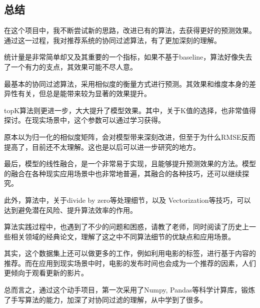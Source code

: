\documentclass[utf8, a4paper, 11pt, onecolumn]{ctexart}
\begin{document}
\begin{spacing}{1.3}
\section{总结}

在这个项目中，我不断尝试新的思路，改进已有的算法，去获得更好的预测效果。通过这一过程，我对推荐系统的协同过滤算法，有了更加深刻的理解。

统计量是非常简单却又及其重要的一个指标，如果不基于baseline，算法好像失去了一个有力的支点，其效果可能不尽人意。

最基本的协同过滤算法，采用相似度的衡量方式进行预测。其效果和维度本身的差异性有关，但总是能带来较为显著的效果提升。

topK算法则更进一步，大大提升了模型效果。其中，关于K值的选择，也非常值得探讨。在现实场景中，这个参数可以通过学习获得。

原本以为归一化的相似度矩阵，会对模型带来深刻改进，但至于为什么RMSE反而提高了，目前还不太理解。这也是以后可以进一步研究的地方。

最后，模型的线性融合，是一个非常易于实现，且能够提升预测效果的方法。模型的融合在各种现实应用场景中也非常地普遍，其融合的各种技巧，还可以继续探究。

此外，算法中，关于divide by zero等处理细节，以及 Vectorization等技巧，可以达到避免潜在风险、提升算法效率的作用。

算法实践过程中，也遇到了不少的问题和困惑，请教了老师，同时阅读了历史上一些相关领域的经典论文，理解了这之中不同算法细节的优缺点和应用场景。

其实，这个数据集上还可以做更多的工作，例如利用电影的标签，进行基于内容的推荐。而在应用到现实场景中时，电影的发布时间也会成为一个推荐的因素，人们更倾向于观看更新的影片。

总而言之，通过这个动手项目，第一次采用了Numpy, Pandas等科学计算库，锻炼了手写算法的能力，加深了对协同过滤的理解，从中学到了很多。





\end{spacing}
\end{document}
